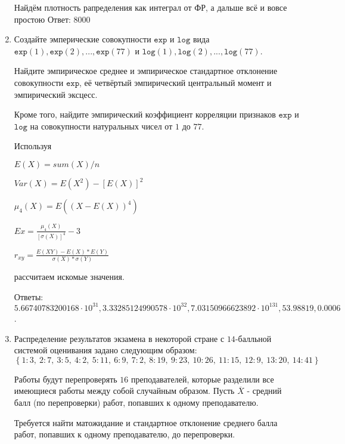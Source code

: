 \documentclass[a4paper,12pt]{article}
\begin{document}
\begin{enumerate}
Найдём плотность рапределения как интеграл от ФР, а дальше всё и вовсе простою Ответ: $8000$


\item

    
    Создайте эмперические совокупности  $\mathtt{\text{exp}}$ и $\mathtt{\text{log}}$ вида $\mathtt{\text{exp}}(1),\mathtt{\text{exp}}(2), ..., \mathtt{\text{exp}}(77) $ и $\mathtt{\text{log}}(1),\mathtt{\text{log}}(2), ..., \mathtt{\text{log}}(77). $

    Найдите эмпирическое среднее и эмпирическое стандартное отклонение совокупности $\mathtt{\text{exp}}$, её четвёртый эмпирический центральный момент и эмпирический эксцесс.

    Кроме того, найдите эмпирический коэффициент корреляции признаков $\mathtt{\text{exp}}$ и $\mathtt{\text{log}}$ на совокупности натуральных чисел от $1$ до $77$.
    


    
    Используя

	$E(X) = sum(X) / n$

	$Var(X) = E(X^2) - [E(X)]^2$

	$\mu_4(X) = E((X-E(X))^4)$

	$Ex = \frac{\mu_4(X)}{[\sigma(X)]^4} - 3$

	$r_{xy} = \frac{E(XY) - E(X) * E(Y)}{\sigma(X) * \sigma(Y)}$

    рассчитаем искомые значения.

    Ответы: $5.66740783200168 \cdot 10^{31}, 3.33285124990578 \cdot 10^{32}, 7.03150966623892 \cdot 10^{131}, 53.98819, 0.0006$.

    

\item

    
    	Распределение результатов экзамена в некоторой стране с $14$-балльной системой оценивания задано следующим образом:
    	$\left\{ 1 : 3, \  2 : 7, \  3 : 5, \  4 : 2, \  5 : 11, \  6 : 9, \  7 : 2, \  8 : 19, \  9 : 23, \  10 : 26, \  11 : 15, \  12 : 9, \  13 : 20, \  14 : 41\right\}$

	Работы будут перепроверять $16$ преподавателей, которые разделили все имеющиеся работы между собой случайным образом. Пусть $\overline{X}$ - средний балл (по перепроверки) работ, попавших к одному преподавателю.

	Требуется найти матожидание и стандартное отклонение среднего балла работ, попавших к одному преподавателю, до перепроверки.
    



\end{enumerate}
\end{document}
